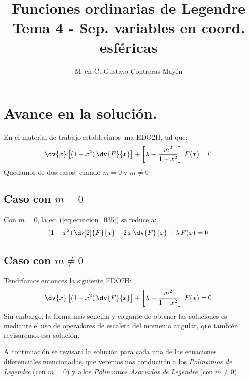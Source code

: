 
\usepackage{apacite}
\title{Funciones ordinarias de Legendre \\ \large {Tema 4 - Sep. variables en coord. esféricas} \vspace{-3ex}}
\author{M. en C. Gustavo Contreras Mayén}
\date{ }

\vspace{-4cm}
\maketitle
\fontsize{14}{14}\selectfont
\tableofcontents
\newpage

\section{Avance en la solución.}
En el material de trabajo establecimos una EDO2H, tal que:
\begin{align}
\dv{x} \left[ (1 - x^{2}) \, \dv{F}{x} \right] + \left[ \lambda - \dfrac{m^{2}}{1 - x^{2}} \right] \, F(x) = 0
\label{eq:ecuacion_035}
\end{align}
Quedamos de dos casos: cuando $m = 0$ y $m \neq 0$
\subsection*{Caso con $m = 0$}
Con $m = 0$, la ec. (\ref{eq:ecuacion_035}) se reduce a:
\begin{align}
(1 - x^{2}) \, \dv[2]{F}{x} - 2  \, x \, \dv{F}{x} + \lambda \, F(x) = 0
\label{eq:ecuacion_036}
\end{align}
\subsection*{Caso con $m \neq 0$}
Tendríamos entonces la siguiente EDO2H:
\begin{align}
\dv{x} \left[ (1 - x^{2}) \, \dv{F}{x} \right] + \left[ \lambda - \dfrac{m^{2}}{1 - x^{2}} \right] \, F(x) = 0
\label{eq:ecuacion_037}
\end{align}
Sin embargo, la forma más sencilla y elegante de obtener las soluciones es mediante el uso de operadores de escalera del momento angular, que también revisaremos esa solución.
\par
A continuación se revisará la solución para cada una de las ecuaciones diferenciales mencionadas, que veremos nos conducirán a los \emph{Polinomios de Legendre} (con $m = 0$) y a los \emph{Polinomios Asociados de Legendre} (con $m \neq 0$)

